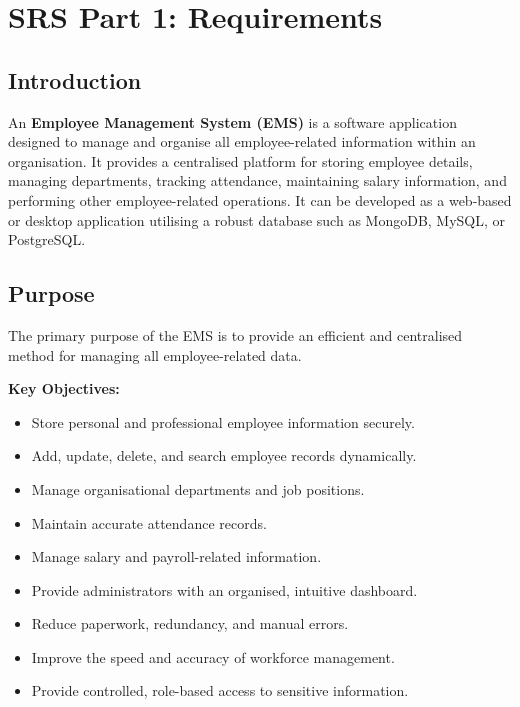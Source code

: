 \documentclass[12pt,a4paper]{report}
\begin{document}
\chapter{SRS Part 1: Requirements}

\section{Introduction}
An \textbf{Employee Management System (EMS)} is a software application designed to manage and
organise all employee-related information within an organisation. It provides a centralised
platform for storing employee details, managing departments, tracking attendance, maintaining
salary information, and performing other employee-related operations. It can be developed as a
web-based or desktop application utilising a robust database such as MongoDB, MySQL, or PostgreSQL.

\section{Purpose}
The primary purpose of the EMS is to provide an efficient and centralised method for managing all
employee-related data.

\textbf{Key Objectives:}
\begin{itemize}
  \item Store personal and professional employee information securely.
  \item Add, update, delete, and search employee records dynamically.
  \item Manage organisational departments and job positions.
  \item Maintain accurate attendance records.
  \item Manage salary and payroll-related information.
  \item Provide administrators with an organised, intuitive dashboard.
  \item Reduce paperwork, redundancy, and manual errors.
  \item Improve the speed and accuracy of workforce management.
  \item Provide controlled, role-based access to sensitive information.
\end{itemize}
\end{document}
